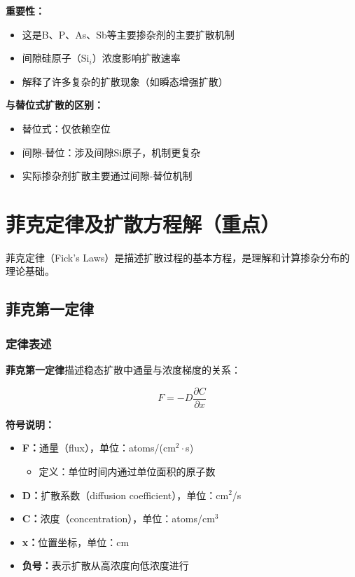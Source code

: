 \documentclass[UTF8,12pt,a4paper]{ctexart}
\begin{document}
\textbf{重要性：}
\begin{itemize}
    \item 这是B、P、As、Sb等主要掺杂剂的主要扩散机制
    \item 间隙硅原子（Si$_i$）浓度影响扩散速率
    \item 解释了许多复杂的扩散现象（如瞬态增强扩散）
\end{itemize}

\textbf{与替位式扩散的区别：}
\begin{itemize}
    \item 替位式：仅依赖空位
    \item 间隙-替位：涉及间隙Si原子，机制更复杂
    \item 实际掺杂剂扩散主要通过间隙-替位机制
\end{itemize}
\newpage
\section{菲克定律及扩散方程解（重点）}

菲克定律（Fick's Laws）是描述扩散过程的基本方程，是理解和计算掺杂分布的理论基础。

\subsection{菲克第一定律}

\subsubsection{定律表述}

\textbf{菲克第一定律}描述稳态扩散中通量与浓度梯度的关系：

\begin{equation}
F = -D \frac{\partial C}{\partial x}
\end{equation}

\textbf{符号说明：}
\begin{itemize}
    \item \textbf{F：}通量（flux），单位：atoms/(cm$^2 \cdot$s)
    \begin{itemize}
        \item 定义：单位时间内通过单位面积的原子数
    \end{itemize}
    \item \textbf{D：}扩散系数（diffusion coefficient），单位：cm$^2$/s
    \item \textbf{C：}浓度（concentration），单位：atoms/cm$^3$
    \item \textbf{x：}位置坐标，单位：cm
    \item \textbf{负号：}表示扩散从高浓度向低浓度进行
\end{itemize}
\end{document}
